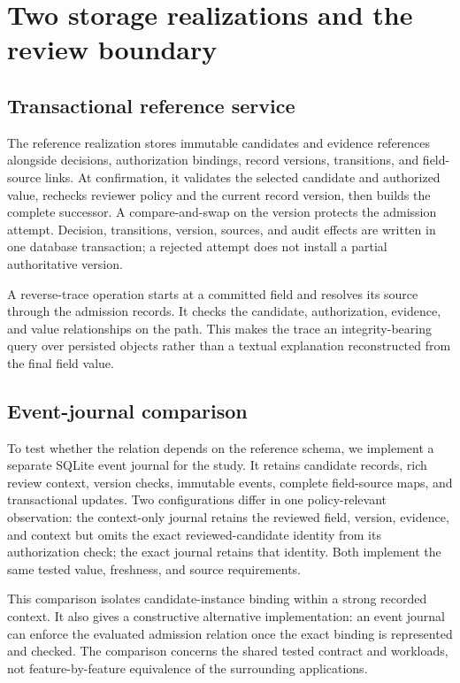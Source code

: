 \documentclass[preprint,12pt,authoryear]{elsarticle}
\begin{document}
\section{Two storage realizations and the review boundary}

\subsection{Transactional reference service}

The reference realization stores immutable candidates and evidence references alongside decisions, authorization bindings, record versions, transitions, and field-source links. At confirmation, it validates the selected candidate and authorized value, rechecks reviewer policy and the current record version, then builds the complete successor. A compare-and-swap on the version protects the admission attempt. Decision, transitions, version, sources, and audit effects are written in one database transaction; a rejected attempt does not install a partial authoritative version.

A reverse-trace operation starts at a committed field and resolves its source through the admission records. It checks the candidate, authorization, evidence, and value relationships on the path. This makes the trace an integrity-bearing query over persisted objects rather than a textual explanation reconstructed from the final field value.

\subsection{Event-journal comparison}

To test whether the relation depends on the reference schema, we implement a separate SQLite event journal for the study. It retains candidate records, rich review context, version checks, immutable events, complete field-source maps, and transactional updates. Two configurations differ in one policy-relevant observation: the context-only journal retains the reviewed field, version, evidence, and context but omits the exact reviewed-candidate identity from its authorization check; the exact journal retains that identity. Both implement the same tested value, freshness, and source requirements.

This comparison isolates candidate-instance binding within a strong recorded context. It also gives a constructive alternative implementation: an event journal can enforce the evaluated admission relation once the exact binding is represented and checked. The comparison concerns the shared tested contract and workloads, not feature-by-feature equivalence of the surrounding applications.
\end{document}
